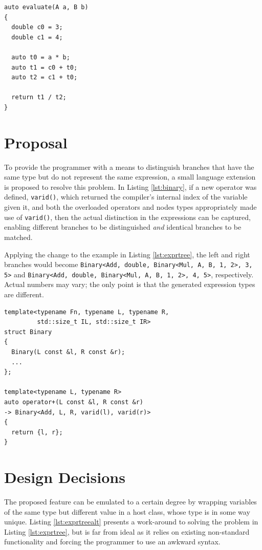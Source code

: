 \documentclass[a4paper,10pt]{article}
\begin{document}
\begin{lstlisting}[float, caption={\texttt{t1} and \texttt{t2} have the same type but do not represent the same expression.}, label=lst:exprtree]
auto evaluate(A a, B b)
{
  double c0 = 3;
  double c1 = 4;

  auto t0 = a * b;
  auto t1 = c0 + t0;
  auto t2 = c1 + t0;

  return t1 / t2;
}
\end{lstlisting}


\section{Proposal}

To provide the programmer with a means to distinguish branches that have the same type but do not represent the same expression, a small language extension is proposed to resolve this problem. In Listing \ref{lst:binary}, if a new operator was defined, \texttt{varid()}, which returned the compiler's internal index of the variable given it, and both the overloaded operators and nodes types appropriately made use of \texttt{varid()}, then the actual distinction in the expressions can be captured, enabling different branches to be distinguished \emph{and} identical branches to be matched.

Applying the change to the example in Listing \ref{lst:exprtree}, the left and right branches would become \newline \texttt{Binary<Add, double, Binary<Mul, A, B, 1, 2>, 3, 5>} and \newline \texttt{Binary<Add, double, Binary<Mul, A, B, 1, 2>, 4, 5>}, respectively. \newline Actual numbers may vary; the only point is that the generated expression types are different.

\begin{lstlisting}[float, caption={By using \texttt{varid()}, differences in expressions can be captured by incorporating the variable identity in the host node type.}, label=lst:binary]
template<typename Fn, typename L, typename R,
         std::size_t IL, std::size_t IR>
struct Binary
{
  Binary(L const &l, R const &r);
  ...
};

template<typename L, typename R>
auto operator+(L const &l, R const &r)
-> Binary<Add, L, R, varid(l), varid(r)>
{
  return {l, r};
}
\end{lstlisting}


\section{Design Decisions}
The proposed feature can be emulated to a certain degree by wrapping variables of the same type but different value in a host class, whose type is in some way unique. Listing \ref{lst:exprtreealt} presents a work-around to solving the problem in Listing \ref{lst:exprtree}, but is far from ideal as it relies on existing non-standard functionality and forcing the programmer to use an awkward syntax.
\end{document}
